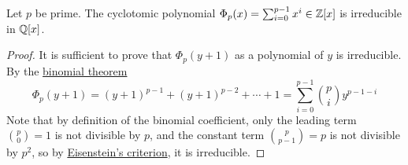 \begin{corollary}
    Let \(p\) be prime.
    The cyclotomic polynomial \(\Phi_p(x) = \sum_{i=0}^{p-1} x^i \in \mathbb{Z}[x]\)
    is irreducible in \(\mathbb{Q}[x]\).
\end{corollary}
\begin{proof}
    It is sufficient to prove that \(\Phi_p(y+1)\)
    as a polynomial of \(y\) is irreducible.
    By the \hyperref[prop:binom]{binomial theorem}
    \begin{equation*}
        \Phi_p(y+1) = {(y+1)}^{p-1} + {(y+1)}^{p-2} + \cdots + 1 
        = \sum_{i=0}^{p-1} \binom{p}{i} y^{p-1-i}
    \end{equation*}
    Note that by definition of the binomial coefficient,
    only the leading term \(\binom{p}{0} = 1\) is not divisible by \(p\),
    and the constant term \(\binom{p}{p-1} = p\) is not divisible by \(p^2\),
    so by \hyperref[cor:eisenstein-criterion]{Eisenstein's criterion},
    it is irreducible.
\end{proof}
